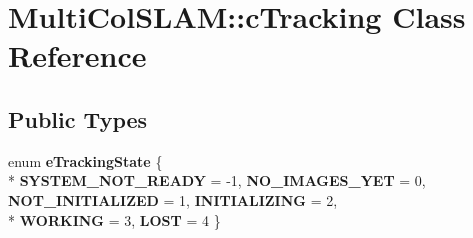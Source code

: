 \hypertarget{classMultiColSLAM_1_1cTracking}{}\section{Multi\+Col\+S\+L\+AM\+:\+:c\+Tracking Class Reference}
\label{classMultiColSLAM_1_1cTracking}
\subsection*{Public Types}
\begin{DoxyCompactItemize}
\item 
enum {\bfseries e\+Tracking\+State} \{ \\*
{\bfseries S\+Y\+S\+T\+E\+M\+\_\+\+N\+O\+T\+\_\+\+R\+E\+A\+DY} = -\/1, 
{\bfseries N\+O\+\_\+\+I\+M\+A\+G\+E\+S\+\_\+\+Y\+ET} = 0, 
{\bfseries N\+O\+T\+\_\+\+I\+N\+I\+T\+I\+A\+L\+I\+Z\+ED} = 1, 
{\bfseries I\+N\+I\+T\+I\+A\+L\+I\+Z\+I\+NG} = 2, 
\\*
{\bfseries W\+O\+R\+K\+I\+NG} = 3, 
{\bfseries L\+O\+ST} = 4
 \}\hypertarget{classMultiColSLAM_1_1cTracking_af17fe51353d4e2f93c93c49bde4b4b52}{}\label{classMultiColSLAM_1_1cTracking_af17fe51353d4e2f93c93c49bde4b4b52}

\end{DoxyCompactItemize}
